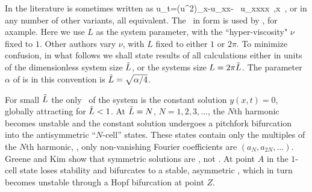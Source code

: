 
In the literature  is sometimes written as
\beq
    u_t=(u^2)_x-u_{xx}- \nu \, u_{xxxx}
    \,,\qquad   x \in [0,L]
    \,,
or in any number of other variants, all equivalent.
The \KSe\ in  form  is used by
\cite{cross93,Mks86,ks04com}, for axample.
Here we use
$L$ as the system parameter, with the ``hyper-viscosity" $\nu$ fixed to $1$.
Other authors vary  $\nu$, with $L$ fixed to either $1$ or $2\pi$.
To minimize confusion,
in what follows we shall state results of all
calculations either in units of the dimensionless system size $\tilde{L}$,
or the systems size $L = 2 \pi \tilde{L}$. The parameter $\alpha$
of  is in this convention is
$\tilde{L}=\sqrt{\alpha/4}$.


For small $\tilde{L}$ the only \eqv\ of the system is the
constant solution $y(x,t)=0$,
globally attracting
for $\tilde{L}<1$. At $\tilde{L}=N$, $N=1,2,3, \dots$,
the $N$th harmonic becomes unstable and the constant solution
undergoes a pitchfork bifurcation into
the antisymmetric ``$N$-cell'' states.
These states contain only the multiples of the $N$th
harmonic, {\ie}, only non-vanishing Fourier coefficients
are $(a_N,a_{2N},\dots)$.
Greene and Kim show that symmetric solutions are \eqva, not \reqva.
At point $A$ in 
the $1$-cell state loses stability
and bifurcates to a stable,
asymmetric \reqv, which in turn becomes unstable
through a Hopf bifurcation at point $Z$.


